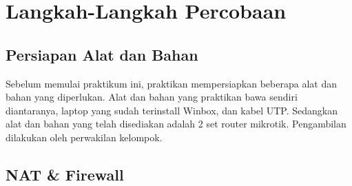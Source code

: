 \section{Langkah-Langkah Percobaan}
\subsection{Persiapan Alat dan Bahan}
Sebelum memulai praktikum ini, praktikan mempersiapkan beberapa alat dan bahan yang diperlukan. Alat dan bahan yang praktikan bawa sendiri diantaranya, laptop yang sudah terinstall Winbox, dan kabel UTP. Sedangkan alat dan bahan yang telah disediakan adalah 2 set router mikrotik. Pengambilan dilakukan oleh perwakilan kelompok.

\subsection{NAT \& Firewall}
